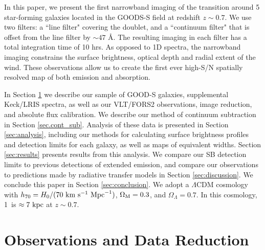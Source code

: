 \documentclass[twocolumn]{aastex61}
\begin{document}
In this paper, we present the first narrowband imaging of the  transition around 5 star-forming  galaxies located in the  GOODS-S field at redshift $z \sim 0.7$. 
We use two filters: a  ``line filter" covering the  doublet, and a ``continuum filter" that is offset from the line filter by ${\sim}47$ \AA.    
The resulting imaging in each filter has a total integration time of 10 hrs. As opposed to 1D spectra, the narrowband imaging constrains the surface brightness, optical depth and radial extent of the wind. These observations allow us to create the first ever high-S/N spatially resolved map of both  emission and absorption. 

In Section \ref{sec:obs_red} we describe our sample of GOOD-S galaxies, supplemental Keck/LRIS spectra, as well as our VLT/FORS2 observations, image reduction, and absolute flux calibration. We describe our method of continuum subtraction in Section \ref{sec.cont_sub}. Analysis of these data is presented in Section \ref{sec:analysis}, 
including our methods for calculating surface brightness profiles and detection limits for each galaxy, as well as maps of  equivalent widths.
Section \ref{sec:results} presents results from this analysis. We compare our SB detection limits to previous detections of extended  emission,  and compare our observations to predictions made by radiative transfer models in Section \ref{sec:discussion}. We conclude this paper in Section \ref{sec:conclusion}.
We adopt a $\Lambda$CDM cosmology with $h_{70} = H_0/(70\ \rm{ km}\ \rm{ s}^{-1}\ \rm{ Mpc}^{-1})$, $\Omega_{\rm{M}}= 0.3$, and $\Omega_{\Lambda} = 0.7$. In this cosmology, 1\arcsec\  is $\approx 7\ \rm kpc$ at $z \sim 0.7$.


\section{Observations and Data Reduction}\label{sec:obs_red}
\end{document}
